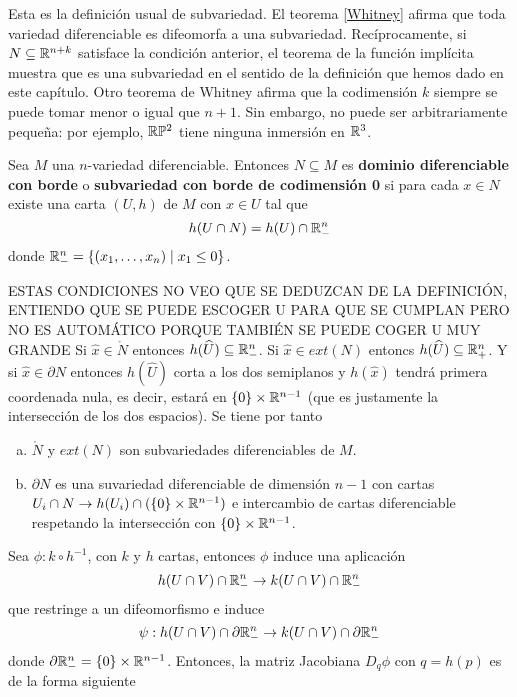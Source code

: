 \documentclass[CV.tex]{subfiles}
\begin{document}
Esta es la definición usual de subvariedad. El teorema \ref{Whitney} afirma que toda variedad diferenciable es difeomorfa a una subvariedad. Recíprocamente, si $N\subseteq\mathbb{R}^{n+k}$ satisface la condición anterior, el teorema de la función implícita muestra que es una subvariedad en el sentido de la definición que hemos dado en este capítulo. Otro teorema de Whitney afirma que la codimensión $k$ siempre se puede tomar menor o igual que $n+1$. Sin embargo, no puede ser arbitrariamente pequeña: por ejemplo, $\mathbb{R}\mathbb{P}^2$ tiene ninguna inmersión en $\mathbb{R}^3$. 

\begin{defi}
Sea $M$ una $n$-variedad diferenciable. Entonces $N\subseteq M$ es \textbf{dominio diferenciable con borde} o \textbf{subvariedad con borde de codimensión 0} si para cada $x\in N$ existe una carta $(U,h)$ de $M$ con $x\in U$ tal que 
\[
h(U\cap N)=h(U)\cap\mathbb{R}^n_-
\]
donde $\mathbb{R}^n_-=\{(x_1,\dots, x_n)\mid x_1\leq 0\}$. 
\end{defi}
ESTAS CONDICIONES NO VEO QUE SE DEDUZCAN DE LA DEFINICIÓN, ENTIENDO QUE SE PUEDE ESCOGER U PARA QUE SE CUMPLAN PERO NO ES AUTOMÁTICO PORQUE TAMBIÉN SE PUEDE COGER U MUY GRANDE
Si $\hat{x}\in \mathring{N}$ entonces $h(\widehat{U})\subseteq\mathbb{R}^n_-$. Si $\hat{x}\in ext(N)$ entoncs $h(\widehat{U})\subseteq\mathbb{R}^n_+$. Y si $\hat{x}\in\partial N$ entonces $h(\widehat{U})$ corta a los dos semiplanos y $h(\hat{x})$ tendrá primera coordenada nula, es decir, estará en $\{0\}\times \mathbb{R}^{n-1}$ (que es justamente la intersección de los dos espacios). Se tiene por tanto
\begin{enumerate}[a)]
\item $\mathring{N}$ y $ext(N)$ son subvariedades diferenciables de $M$.
\item $\partial N$ es una suvariedad diferenciable de dimensión $n-1$ con cartas $U_i\cap N\to h(U_i)\cap (\{0\}\times\mathbb{R}^{n-1})$ e intercambio de cartas diferenciable respetando la intersección con $\{0\}\times\mathbb{R}^{n-1}$. 
\end{enumerate}
Sea $\phi:k\circ h^{-1}$, con $k$ y $h$ cartas, entonces $\phi$ induce una aplicación 
\[
h(U\cap V)\cap\mathbb{R}^n_-\to k(U\cap V)\cap\mathbb{R}^n_-
\]
que restringe a un difeomorfismo e induce 
\[
\psi:h(U\cap V)\cap\partial\mathbb{R}^n_-\to k(U\cap V)\cap\partial\mathbb{R}^n_-
\]
donde $\partial\mathbb{R}^n_-=\{0\}\times\mathbb{R}^{n-1}$. Entonces, la matriz Jacobiana $D_q\phi$ con $q=h(p)$ es de la forma siguiente
\end{document}
